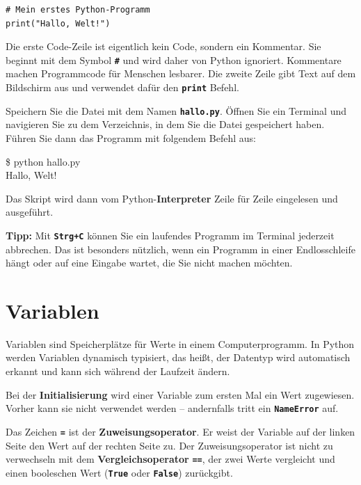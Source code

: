 \documentclass[ngerman,11pt]{article}
\begin{document}
\begin{lstlisting}[caption=hallo.py]
# Mein erstes Python-Programm
print("Hallo, Welt!")
\end{lstlisting}

\noindent Die erste Code-Zeile ist eigentlich kein Code, sondern ein Kommentar. Sie beginnt mit dem Symbol \textbf{\texttt{\#}} und wird daher von Python ignoriert. Kommentare machen Programmcode für Menschen lesbarer. Die zweite Zeile gibt Text auf dem Bildschirm aus und verwendet dafür den \textbf{\texttt{print}} Befehl.

Speichern Sie die Datei mit dem Namen \textbf{\texttt{hallo.py}}. Öffnen Sie ein Terminal und navigieren Sie zu dem Verzeichnis, in dem Sie die Datei gespeichert haben. Führen Sie dann das Programm mit folgendem Befehl aus:

\begin{tcolorbox}[colback=gray!15, fontupper=\ttfamily, boxrule=0.5pt,
    left=3mm, right=3mm, top=2mm, bottom=2mm]
\$ python hallo.py\\
Hallo, Welt!
\end{tcolorbox}

\noindent Das Skript wird dann vom Python-\textbf{Interpreter} Zeile für Zeile eingelesen und ausgeführt.

\textbf{Tipp:} Mit \textbf{\texttt{Strg+C}} können Sie ein laufendes Programm im Terminal jederzeit abbrechen. Das ist besonders nützlich, wenn ein Programm in einer Endlosschleife hängt oder auf eine Eingabe wartet, die Sie nicht machen möchten.

\section{Variablen}

Variablen sind Speicherplätze für Werte in einem Computerprogramm. In Python werden Variablen dynamisch typisiert, das heißt, der Datentyp wird automatisch erkannt und kann sich während der Laufzeit ändern.

Bei der \textbf{Initialisierung} wird einer Variable zum ersten Mal ein Wert zugewiesen. Vorher kann sie nicht verwendet werden -- andernfalls tritt ein \textbf{\texttt{NameError}} auf.

Das Zeichen \textbf{\texttt{=}} ist der \textbf{Zuweisungsoperator}. Er weist der Variable auf der linken Seite den Wert auf der rechten Seite zu. Der Zuweisungsoperator ist nicht zu verwechseln mit dem \textbf{Vergleichsoperator} \textbf{\texttt{==}}, der zwei Werte vergleicht und einen booleschen Wert (\textbf{\texttt{True}} oder \textbf{\texttt{False}}) zurückgibt.
\end{document}
